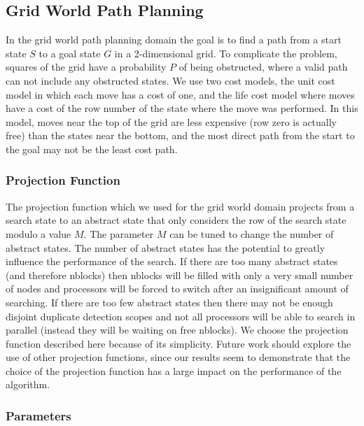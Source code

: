 \documentclass{article}
\begin{document}

 \subsection{Grid World Path Planning}

 In the grid world path planning domain the goal is to find a path from
 a start state $S$ to a goal state $G$ in a 2-dimensional grid.  To
 complicate the problem, squares of the grid have a probability $P$ of
 being obstructed, where a valid path can not include any obstructed
 states.  We use two cost models, the unit cost model in which each
 move has a cost of one, and the life cost model where moves have a
 cost of the row number of the state where the move was performed.  In
 this model, moves near the top of the grid are less expensive (row
 zero is actually free) than the states near the bottom, and the most
 direct path from the start to the goal may not be the least cost path.

 \subsubsection{Projection Function}

 The projection function which we used for the grid world domain
 projects from a search state to an abstract state that only considers
 the row of the search state modulo a value $M$.  The parameter $M$ can
 be tuned to change the number of abstract states.  The number of
 abstract states has the potential to greatly influence the performance
 of the search.  If there are too many abstract states (and therefore
 nblocks) then nblocks will be filled with only a very small number of
 nodes and processors will be forced to switch after an insignificant
 amount of searching.  If there are too few abstract states then there
 may not be enough disjoint duplicate detection scopes and not all
 processors will be able to search in parallel (instead they will be
 waiting on free nblocks).  We choose the projection function described
 here because of its simplicity.  Future work should explore the use of
 other projection functions, since our results seem to demonstrate that
 the choice of the projection function has a large impact on the
 performance of the algorithm.

 \subsubsection{Parameters}
\end{document}
